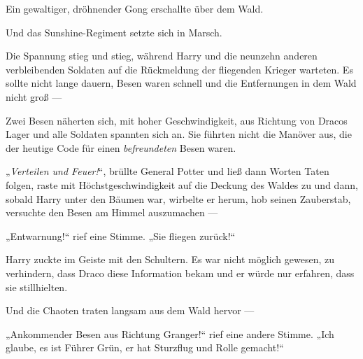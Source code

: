 \later

Ein gewaltiger, dröhnender Gong erschallte über dem Wald.

Und das Sunshine-Regiment setzte sich in Marsch.

\later

Die Spannung stieg und stieg, während Harry und die neunzehn anderen verbleibenden Soldaten auf die Rückmeldung der fliegenden Krieger warteten. Es sollte nicht lange dauern, Besen waren schnell und die Entfernungen in dem Wald nicht groß —

Zwei Besen näherten sich, mit hoher Geschwindigkeit, aus Richtung von Dracos Lager und alle Soldaten spannten sich an. Sie führten nicht die Manöver aus, die der heutige Code für einen \emph{befreundeten} Besen waren.

„\emph{Verteilen und Feuer!}“, brüllte General Potter und ließ dann Worten Taten folgen, raste mit Höchstgeschwindigkeit auf die Deckung des Waldes zu und dann, sobald Harry unter den Bäumen war, wirbelte er herum, hob seinen Zauberstab, versuchte den Besen am Himmel auszumachen —

„Entwarnung!“ rief eine Stimme.
„Sie fliegen zurück!“

Harry zuckte im Geiste mit den Schultern. Es war nicht möglich gewesen, zu verhindern, dass Draco diese Information bekam und er würde nur erfahren, dass sie stillhielten.

Und die Chaoten traten langsam aus dem Wald hervor —

„Ankommender Besen aus Richtung Granger!“ rief eine andere Stimme.
„Ich glaube, es ist Führer Grün, er hat Sturzflug und Rolle gemacht!“


